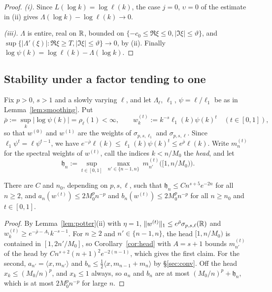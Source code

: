 \begin{proof}
\emph{(i).} Since $L(\log k)=\log\ell(k)$, the case $j=0$, $\upsilon=0$ of the estimate in (ii) gives
$\Lambda(\log k)-\log\ell(k)\to0$.

\emph{(iii).} $\Lambda$ is entire, real on $\mathbb{R}$, bounded on $\{-c_0\le\Re\xi\le0,|\Im\xi|\le\vartheta\}$, and
$\sup\{|\Lambda'(\xi)|:\Re\xi\ge T,|\Im\xi|\le\vartheta\}\to0$, by (ii). Finally $\log\psi(k)=\log\ell(k)-\Lambda(\log k)$.
\end{proof}

\subsection{Stability under a factor tending to one}\label{sec:stability}
Fix $p>0$, $s>1$ and a slowly varying $\ell$, and let $\Lambda_\ell$, $\ell_1$, $\psi=\ell/\ell_1$ be as in
Lemma~\ref{lem:smoothing}. Put
\[
  \bar\rho:=\sup_k|\log\psi(k)|=\rho_\ell(1)<\infty,\qquad w^{(t)}_k:=k^{-s}\ell_1(k)\psi(k)^t\quad(t\in[0,1]),
\]
so that $w^{(0)}$ and $w^{(1)}$ are the weights of $\sigma_{p,s,\ell_1}$ and $\sigma_{p,s,\ell}$. Since
$\ell_1\psi^t=\ell\psi^{t-1}$, we have $e^{-\bar\rho}\ell(k)\le\ell_1(k)\psi(k)^t\le e^{\bar\rho}\ell(k)$. Write
$m^{(t)}_n$ for the spectral weights of $w^{(t)}$, call the indices $k<n/M_0$ the \emph{head}, and let
\[
  \mathfrak h_n:=\sup_{t\in[0,1]}\ \max_{n'\in\{n-1,n\}}\ m^{(t)}_{n'}\bigl([1,n/M_0)\bigr).
\]

\begin{lemma}\label{lem:apriori}
There are $C$ and $n_0$, depending on $p,s,\ell$, such that $\mathfrak h_n\le Cn^{s+5}e^{-2n}$ for all $n\ge2$, and
$a_n(w^{(t)})\le2M_0^pn^{-p}$ and $b_n(w^{(t)})\le2M_0^pn^{-p}$ for all $n\ge n_0$ and $t\in[0,1]$.
\end{lemma}

\begin{proof}
By Lemma~\ref{lem:potter}(ii) with $\eta=1$, $\|w^{(t)}\|_1\le e^{\bar\rho}\sigma_{p,s,\ell}(\mathbb{R})$ and $w^{(t)}_k\ge
e^{-\bar\rho-A_1}k^{-s-1}$. For $n\ge2$ and $n'\in\{n-1,n\}$, the head $[1,n/M_0)$ is contained in $[1,2n'/M_0]$, so
Corollary~\ref{cor:head} with $A=s+1$ bounds $m^{(t)}_{n'}$ of the head by $Cn^{s+2}(n+1)^2e^{-2(n-1)}$, which gives the
first claim. For the second, $a_{n'}=\langle x,m_{n'}\rangle$ and $b_n\le\frac12\langle x,m_{n-1}+m_n\rangle$ by
\S\ref{sec:conv}. Off the head $x_k\le(M_0/n)^p$, and $x_k\le1$ always, so $a_n$ and $b_n$ are at most
$(M_0/n)^p+\mathfrak h_n$, which is at most $2M_0^pn^{-p}$ for large $n$.
\end{proof}

